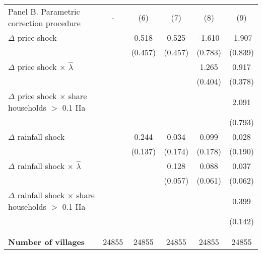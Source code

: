\begin{table}[H]
\centering\begingroup\fontsize{10}{12}\selectfont

\begin{tabular}{lccccc}
\toprule
Panel B. Parametric correction procedure & - & (6) & (7) & (8) & (9)\\

$\Delta$ price shock &  & 0.518 & 0.525 & -1.610 & -1.907\\
 &  & (0.457) & (0.457) & (0.783) & (0.839)\\
$\Delta$ price shock $\times$ $\widehat{\lambda}$ &  &  &  & 1.265 & 0.917\\
 &  &  &  & (0.404) & (0.378)\\
$\Delta$ price shock $\times$ share households $>$ 0.1 Ha &  &  &  &  & 2.091\\
\addlinespace
 &  &  &  &  & (0.793)\\
$\Delta$ rainfall shock &  & 0.244 & 0.034 & 0.099 & 0.028\\
 &  & (0.137) & (0.174) & (0.178) & (0.190)\\
$\Delta$ rainfall shock $\times$ $\widehat{\lambda}$ &  &  & 0.128 & 0.088 & 0.037\\
 &  &  & (0.057) & (0.061) & (0.062)\\
\addlinespace
$\Delta$ rainfall shock $\times$ share households $>$ 0.1 Ha &  &  &  &  & 0.399\\
 &  &  &  &  & (0.142)\\
 &  &  &  &  & \\
 &  &  &  &  & \\
\textbf{Number of villages} & 24855 & 24855 & 24855 & 24855 & 24855\\
\bottomrule
\end{tabular}
\endgroup{}
\end{table}
\bottomrule
